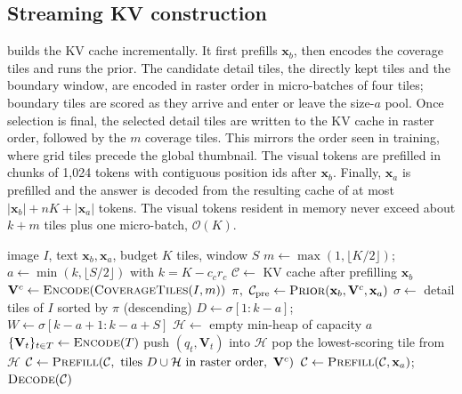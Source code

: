 \subsection{Streaming KV construction}
\label{sec:streaming}

\method builds the KV cache incrementally. It first prefills $\mathbf{x}_b$, then encodes the coverage
tiles and runs the prior. The candidate detail tiles, \ie the directly kept tiles and the boundary window,
are encoded in raster order in micro-batches of four tiles; boundary tiles are scored as they arrive and
enter or leave the size-$a$ pool. Once selection is final, the selected detail tiles are written to the
KV cache in raster order, followed by the $m$ coverage tiles. This mirrors the order seen in training,
where grid tiles precede the global thumbnail. The visual tokens are prefilled in chunks of 1{,}024
tokens with contiguous position ids after $\mathbf{x}_b$. Finally, $\mathbf{x}_a$ is prefilled and the
answer is decoded from the resulting cache of at most $|\mathbf{x}_b|+nK+|\mathbf{x}_a|$ tokens. The
visual tokens resident in memory never exceed about $k+m$ tiles plus one micro-batch, \ie
$\mathcal{O}(K)$.

\begin{algorithm}[t]
\caption{\method inference for one image--question pair}
\label{alg:foveatile}
\begin{algorithmic}[1]
\Require image $I$, text $\mathbf{x}_b,\mathbf{x}_a$, budget $K$ tiles, window $S$
\State $m\gets\max(1,\lfloor K/2\rfloor)$;\ \ $a\gets\min(k,\lfloor S/2\rfloor)$ with $k=K-c_cr_c$
\State $\mathcal{C}\gets$ KV cache after prefilling $\mathbf{x}_b$
\State $\mathbf{V}^{c}\gets\textsc{Encode}(\textsc{CoverageTiles}(I,m))$
\State $\pi,\ \mathcal{C}_{\text{pre}}\gets\textsc{Prior}(\mathbf{x}_b,\mathbf{V}^{c},\mathbf{x}_a)$
\State $\sigma\gets$ detail tiles of $I$ sorted by $\pi$ (descending)
\State $D\gets\sigma[1{:}k-a]$;\ \ $W\gets\sigma[k-a+1{:}k-a+S]$ 
\State $\mathcal{H}\gets$ empty min-heap of capacity $a$
  \State $\{\mathbf{V}_t\}_{t\in T}\gets\textsc{Encode}(T)$
    \State push $(q_t,\mathbf{V}_t)$ into $\mathcal{H}$ 
     pop the lowest-scoring tile from $\mathcal{H}$ \EndIf
  \EndFor
\EndFor
\State $\mathcal{C}\gets\textsc{Prefill}(\mathcal{C},\ \text{tiles }D\cup\mathcal{H}\text{ in raster order},\ \mathbf{V}^{c})$
\State $\mathcal{C}\gets\textsc{Prefill}(\mathcal{C},\mathbf{x}_a)$;\ \ \Return $\textsc{Decode}(\mathcal{C})$
\end{algorithmic}
\end{algorithm}

